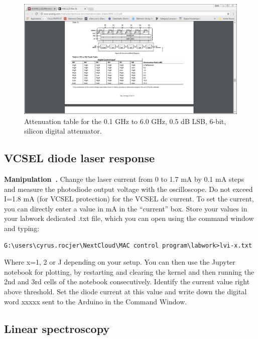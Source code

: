 \documentclass[a4paper,11pt]{article}
\newcounter{manip}
\newenvironment{manip}[1][]{\refstepcounter{manip}\par\medskip
	\textbf{Manipulation~\themanip. #1} \rmfamily }{\medskip}
\begin{document}
\begin{figure}[h!]
	\centering
	\includegraphics[width=0.9\linewidth,trim={7cm 4.2cm 12cm 9.1cm},clip]{attenuation-table}
	\caption{Attenuation table for the 0.1 GHz to 6.0 GHz, 0.5 dB LSB, 6-bit, silicon digital attenuator.}
	\label{fig:attenuation-table}
\end{figure}

\subsection{VCSEL diode laser response}

\begin{manip}
Change the laser current from 0 to 1.7 mA by 0.1 mA steps and measure the photodiode output voltage with the oscilloscope. Do not exceed I=1.8 mA (for VCSEL protection) for the VCSEL dc current. To set the current, you can directly enter a value in mA in the “current” box.
Store your values in your labwork dedicated .txt file, which you can open using the command window and typing:
\begin{verbatim}
G:\users\cyrus.rocjer\NextCloud\MAC control program\labwork>lvi-x.txt
\end{verbatim}
Where x=1, 2 or J depending on your setup.
You can then use the Jupyter notebook for plotting, by restarting and clearing the kernel and then running the 2nd and 3rd cells of the notebook consecutively.
Identify the current value right above threshold. Set the diode current at this value and write down the digital word xxxxx sent to the Arduino in the Command Window.
\end{manip}

\subsection{Linear spectroscopy}
\end{document}
